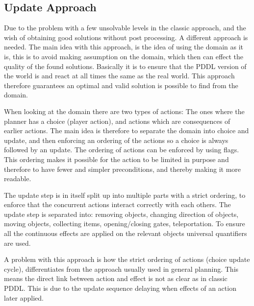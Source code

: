 		\subsection{Update Approach}

		Due to the problem with a few unsolvable levels in the classic approach, and the wish of obtaining good solutions without post processing. A different approach is needed. The main idea with this approach, is the idea of using the domain as it is, this is to avoid making assumption on the domain, which then can effect the quality of the found solutions. Basically it is to ensure that the PDDL version of the world is and react at all times the same as the real world. This approach therefore guarantees an optimal and valid solution is possible to find from the domain.
		
		When looking at the domain there are two types of actions: The ones where the planner has a choice (player action), and actions which are consequences of earlier actions. The main idea is therefore to separate the domain into choice and update, and then enforcing an ordering of the actions so a choice is always followed by an update. The ordering of actions can be enforced by using flags. This ordering makes it possible for the action to be limited in purpose and therefore to have fewer and simpler preconditions, and thereby making it more readable.
		
		The update step is in itself split up into multiple parts with a strict ordering, to enforce that the concurrent actions interact correctly with each others. The update step is separated into: removing objects, changing direction of objects, moving objects, collecting items, opening/closing gates, teleportation. To ensure all the continuous effects are applied on the relevant objects universal quantifiers are used. 
		
		A problem with this approach is how the strict ordering of actions (choice update cycle), differentiates from the approach usually used in general planning. This means the direct link between action and effect is not as clear as in classic PDDL. This is due to the update sequence delaying when effects of an action later applied. 
		
	

	
	

